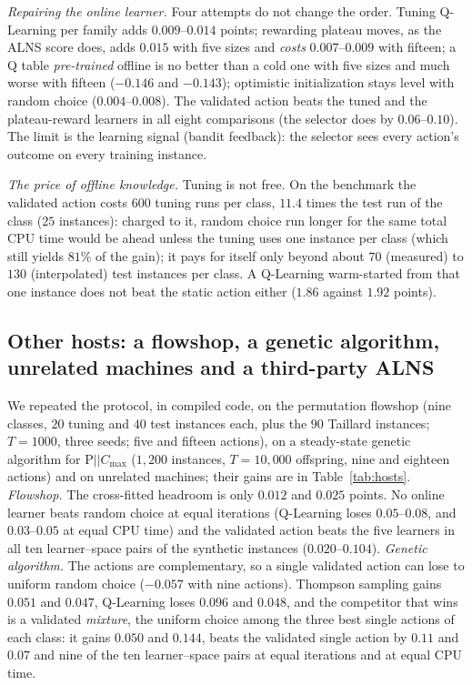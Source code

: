 \documentclass[conference,a4paper]{IEEEtran}
\newcommand{\Cmax}{C_{\max}}
\begin{document}
\emph{Repairing the online learner.} Four attempts do not change the order. Tuning Q-Learning per family adds $0.009$--$0.014$ points; rewarding plateau moves, as the ALNS score does, adds $0.015$ with five sizes and \emph{costs} $0.007$--$0.009$ with fifteen; a Q table \emph{pre-trained} offline is no better than a cold one with five sizes and much worse with fifteen ($-0.146$ and $-0.143$); optimistic initialization stays level with random choice ($0.004$--$0.008$).
The validated action beats the tuned and the plateau-reward learners in all eight comparisons (the selector does by $0.06$--$0.10$). The limit is the learning signal (bandit feedback): the selector sees every action's outcome on every training instance.

\emph{The price of offline knowledge.} Tuning is not free. On the benchmark the validated action costs $600$ tuning runs per class, $11.4$ times the test run of the class ($25$ instances): charged to it, random choice run longer for the same total CPU time would be ahead unless the tuning uses one instance per class (which still yields $81\%$ of the gain); it pays for itself only beyond about $70$ (measured) to $130$ (interpolated) test instances per class. A Q-Learning warm-started from that one instance does not beat the static action either ($1.86$ against $1.92$ points).



\subsection{Other hosts: a flowshop, a genetic algorithm, unrelated machines and a third-party ALNS}
\label{sec:flowshop}
We repeated the protocol, in compiled code, on the permutation flowshop (nine classes, $20$ tuning and $40$ test instances each, plus the $90$ Taillard instances; $T=1000$, three seeds; five and fifteen actions), on a steady-state genetic algorithm for P$||\Cmax$ ($1{,}200$ instances, $T=10{,}000$ offspring, nine and eighteen actions) and on unrelated machines; their gains are in Table~\ref{tab:hosts}.
\emph{Flowshop.} The cross-fitted headroom is only $0.012$ and $0.025$ points. No online learner beats random choice at equal iterations (Q-Learning loses $0.05$--$0.08$, and $0.03$--$0.05$ at equal CPU time) and the validated action beats the five learners in all ten learner--space pairs of the synthetic instances ($0.020$--$0.104$).
\emph{Genetic algorithm.} The actions are complementary, so a single validated action can lose to uniform random choice ($-0.057$ with nine actions). Thompson sampling gains $0.051$ and $0.047$, Q-Learning loses $0.096$ and $0.048$, and the competitor that wins is a validated \emph{mixture}, the uniform choice among the three best single actions of each class: it gains $0.050$ and $0.144$, beats the validated single action by $0.11$ and $0.07$ and nine of the ten learner--space pairs at equal iterations and at equal CPU time.
\end{document}
